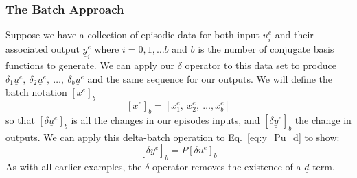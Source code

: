 \FloatBarrier\subsubsection{The Batch Approach}
Suppose we have a collection of episodic data for both input $\underline{u}_i^e$ and their associated output $\underline{y}_i^e$ where $i = 0, 1, \dots b$ and $b$ is the number of conjugate basis functions to generate. We can apply our $\delta$ operator to this data set to produce $\delta_1 \underline{u}^e,\ \delta_2 \underline{u}^e,\ \dots,\ \delta_b \underline{u}^e$ and the same sequence for our outputs. We will define the batch notation ${\left[{x}^e\right]}_b$
\begin{equation}
    {\left[{x}^e\right]}_b  = \left[{x}_1^e,\ {x}_2^e,\ \dots, {x}_b^e\right]
\end{equation}
so that ${\left[\delta\underline{u}^e\right]}_b$ is all the changes in our episodes inputs, and ${\left[\delta\underline{y}^e\right]}_b$ the change in outputs. We can apply this delta-batch operation to Eq.~\ref{eq:y_Pu_d} to show:
\begin{equation}
    {\left[\delta\underline{y}^e\right]}_b = P {\left[\delta\underline{u}^e\right]}_b
    \label{eq:del_y_batch_P_del_u_batch}
\end{equation}
As with all earlier examples, the $\delta$ operator removes the existence of a $\underline{d}$ term.


